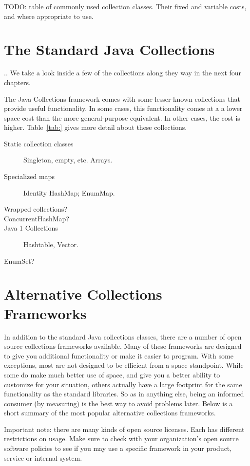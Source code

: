 
TODO: table of commonly used collection classes. Their fixed and variable
costs, and where appropriate to use. 

\section{The Standard Java Collections}

.. We take a look inside a few of the collections along they way in the next
four chapters. 

The Java Collections framework comes with some lesser-known collections that
provide useful functionality.  In some cases, this functionality comes at a 
a lower space cost than the more general-purpose equivalent.  In other cases,
the cost is higher. Table~\ref{tab:} gives more detail about these collections.

\begin{description}
\item[Static collection classes] Singleton, empty, etc. Arrays.
\item[Specialized maps] Identity HashMap; EnumMap.
\item[Wrapped collections?]
\item[ConcurrentHashMap?]
\item[Java 1 Collections] Hashtable, Vector.
\item[EnumSet?]
\end{description}


\section{Alternative Collections Frameworks}
In addition to the standard Java collections classes, there are a number of
open source collections frameworks available. Many of these frameworks
are designed to give you additional functionality or make it easier to
program. With some exceptions, most are not designed to be efficient from a
space standpoint. While some do make much better use of space, and give you a
better ability to customize for your situation, others actually have a
large footprint for the same functionality as the standard libraries. So as in
anything else, being an informed consumer (by measuring) is the best way to
avoid problems later. Below is a short summary of the most
popular alternative collections frameworks.

Important note: there are many kinds of open source licenses. Each has different
restrictions on usage. Make sure to check with your organization's open
source software policies to see if you may use a specific framework in 
your product, service or internal system.

